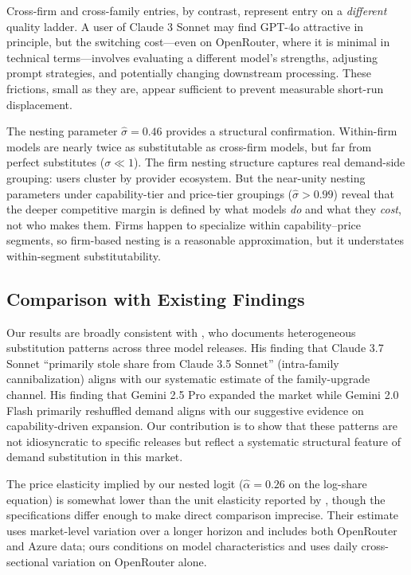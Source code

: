 \documentclass[11pt, a4paper]{article}
\begin{document}
Cross-firm and cross-family entries, by contrast, represent entry on a \emph{different} quality ladder. A user of Claude 3 Sonnet may find GPT-4o attractive in principle, but the switching cost---even on OpenRouter, where it is minimal in technical terms---involves evaluating a different model's strengths, adjusting prompt strategies, and potentially changing downstream processing. These frictions, small as they are, appear sufficient to prevent measurable short-run displacement.

The nesting parameter $\hat{\sigma} = 0.46$ provides a structural confirmation. Within-firm models are nearly twice as substitutable as cross-firm models, but far from perfect substitutes ($\sigma \ll 1$). The firm nesting structure captures real demand-side grouping: users cluster by provider ecosystem. But the near-unity nesting parameters under capability-tier and price-tier groupings ($\hat{\sigma} > 0.99$) reveal that the deeper competitive margin is defined by what models \emph{do} and what they \emph{cost}, not who makes them. Firms happen to specialize within capability--price segments, so firm-based nesting is a reasonable approximation, but it understates within-segment substitutability.

\subsection{Comparison with Existing Findings}

Our results are broadly consistent with \citet{fradkin2025demand}, who documents heterogeneous substitution patterns across three model releases. His finding that Claude 3.7 Sonnet ``primarily stole share from Claude 3.5 Sonnet'' (intra-family cannibalization) aligns with our systematic estimate of the family-upgrade channel. His finding that Gemini 2.5 Pro expanded the market while Gemini 2.0 Flash primarily reshuffled demand aligns with our suggestive evidence on capability-driven expansion. Our contribution is to show that these patterns are not idiosyncratic to specific releases but reflect a systematic structural feature of demand substitution in this market.

The price elasticity implied by our nested logit ($\hat{\alpha} = 0.26$ on the log-share equation) is somewhat lower than the unit elasticity reported by \citet{demirer2025emerging}, though the specifications differ enough to make direct comparison imprecise. Their estimate uses market-level variation over a longer horizon and includes both OpenRouter and Azure data; ours conditions on model characteristics and uses daily cross-sectional variation on OpenRouter alone.
\end{document}
